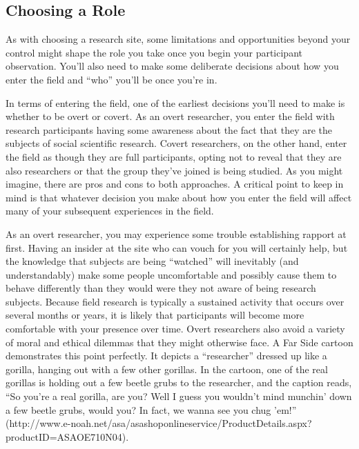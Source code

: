 \subsection{Choosing a Role}

As with choosing a research site, some limitations and opportunities beyond your control might shape the role you take once you begin your participant observation. You’ll also need to make some deliberate decisions about how you enter the field and “who” you’ll be once you’re in.

In terms of entering the field, one of the earliest decisions you’ll need to make is whether to be overt or covert. As an overt researcher, you enter the field with research participants having some awareness about the fact that they are the subjects of social scientific research. Covert researchers, on the other hand, enter the field as though they are full participants, opting not to reveal that they are also researchers or that the group they’ve joined is being studied. As you might imagine, there are pros and cons to both approaches. A critical point to keep in mind is that whatever decision you make about how you enter the field will affect many of your subsequent experiences in the field.

As an overt researcher, you may experience some trouble establishing rapport at first. Having an insider at the site who can vouch for you will certainly help, but the knowledge that subjects are being “watched” will inevitably (and understandably) make some people uncomfortable and possibly cause them to behave differently than they would were they not aware of being research subjects. Because field research is typically a sustained activity that occurs over several months or years, it is likely that participants will become more comfortable with your presence over time. Overt researchers also avoid a variety of moral and ethical dilemmas that they might otherwise face. A Far Side cartoon demonstrates this point perfectly. It depicts a “researcher” dressed up like a gorilla, hanging out with a few other gorillas. In the cartoon, one of the real gorillas is holding out a few beetle grubs to the researcher, and the caption reads, “So you’re a real gorilla, are you? Well I guess you wouldn’t mind munchin’ down a few beetle grubs, would you? In fact, we wanna see you chug ’em!” (http://www.e-noah.net/asa/asashoponlineservice/ProductDetails.aspx?productID=ASAOE710N04).

